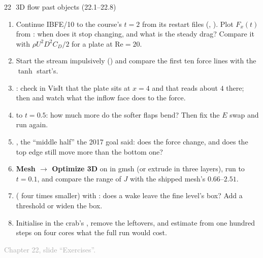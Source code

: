 \documentclass[aspectratio=169,11pt]{beamer}
\newcommand{\sourcecredit}[1]{\vfill\begin{flushright}\tiny\textcolor{DarkGray}{#1}\end{flushright}}
\begin{document}
\begin{frame}{22\,\textbullet\ 3D flow past objects (22.1--22.8)}
\label{fr:c22x1}
\footnotesize
\begin{enumerate}
  \item[22.1] Continue IBFE/10 to the course's $t = 2$ from its restart files (, ). Plot $F_x(t)$ from : when does it stop changing, and what is the steady drag? Compare it with $\rho U^2 D^2 C_D/2$ for a plate at $\mathrm{Re} = 20$.
  \item[22.2] Start the stream impulsively () and compare the first ten force lines with the $\tanh$ start's.
  \item[22.3] : check in VisIt that the plate sits at $x = 4$ and that  reads about $4$ there; then  and watch what the inflow face does to the force.
  \item[22.4]  to $t = 0.5$: how much more do the softer flaps bend? Then fix the $E$ swap and run again.
  \item[22.5] , the ``middle half'' the 2017 goal said: does the force change, and does the top edge still move more than the bottom one?
  \item[22.6] \textbf{Mesh $\to$ Optimize 3D} on  in gmsh (or extrude in three layers), run to $t = 0.1$, and compare the range of $J$ with the shipped mesh's $0.66$--$2.51$.
  \item[22.7]  ( four times smaller) with : does a wake leave the fine level's box? Add a threshold or widen the box.
  \item[22.8] Initialise  in the crab's , remove the leftovers, and estimate from one hundred steps on four cores what the full run would cost.
\end{enumerate}
\sourcecredit{Chapter 22, slide ``Exercises''.}
\end{frame}
\end{document}

